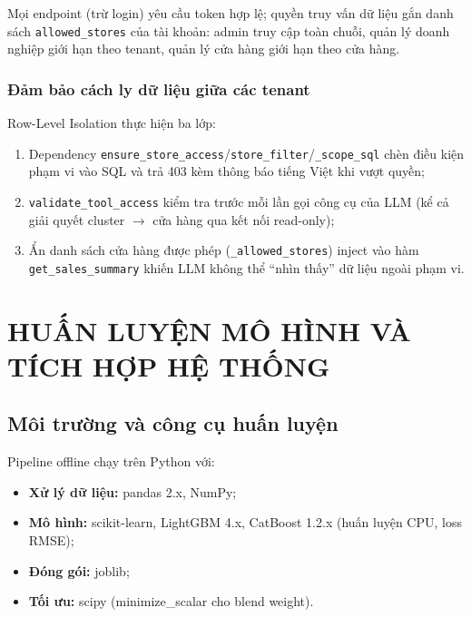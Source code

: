 \documentclass[12pt,a4paper]{report}
\begin{document}
Mọi endpoint (trừ login) yêu cầu token hợp lệ; quyền truy vấn dữ liệu gắn danh sách \texttt{allowed\_stores} của tài khoản: admin truy cập toàn chuỗi, quản lý doanh nghiệp giới hạn theo tenant, quản lý cửa hàng giới hạn theo cửa hàng.

\subsection{Đảm bảo cách ly dữ liệu giữa các tenant}

Row-Level Isolation thực hiện ba lớp:
\begin{enumerate}
    \item Dependency \texttt{ensure\_store\_access}/\texttt{store\_filter}/\texttt{\_scope\_sql} chèn điều kiện phạm vi vào SQL và trả 403 kèm thông báo tiếng Việt khi vượt quyền;
    \item \texttt{validate\_tool\_access} kiểm tra trước mỗi lần gọi công cụ của LLM (kể cả giải quyết cluster $\rightarrow$ cửa hàng qua kết nối read-only);
    \item Ẩn danh sách cửa hàng được phép (\texttt{\_allowed\_stores}) inject vào hàm \texttt{get\_sales\_summary} khiến LLM không thể ``nhìn thấy'' dữ liệu ngoài phạm vi.
\end{enumerate}

\cleardoublepage

\chapter{HUẤN LUYỆN MÔ HÌNH VÀ TÍCH HỢP HỆ THỐNG}

\section{Môi trường và công cụ huấn luyện}

Pipeline offline chạy trên Python với:
\begin{itemize}
    \item \textbf{Xử lý dữ liệu:} pandas 2.x, NumPy;
    \item \textbf{Mô hình:} scikit-learn, LightGBM 4.x, CatBoost 1.2.x (huấn luyện CPU, loss RMSE);
    \item \textbf{Đóng gói:} joblib;
    \item \textbf{Tối ưu:} scipy (minimize\_scalar cho blend weight).
\end{itemize}
\end{document}
